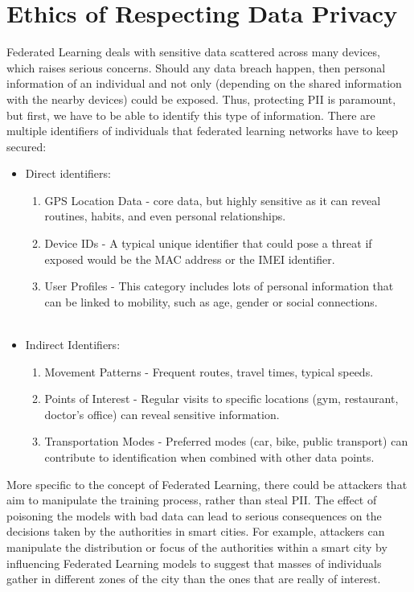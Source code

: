 \documentclass[conference]{IEEEtran}
\begin{document}
\section{Ethics of Respecting Data Privacy}
Federated Learning deals with sensitive data scattered across many devices, which raises serious concerns. Should any data breach happen, then personal information of an individual and not only (depending on the shared information with the nearby devices) could be exposed. Thus, protecting PII is paramount, but first, we have to be able to identify this type of information. There are multiple identifiers of individuals that federated learning networks have to keep secured:
\begin{itemize}
  \item Direct identifiers:
  \begin{enumerate}
    \item GPS Location Data - core data, but highly sensitive as it can reveal routines, habits, and even personal relationships.
    \item Device IDs - A typical unique identifier that could pose a threat if exposed would be the MAC address or the IMEI identifier.
    \item User Profiles - This category includes lots of personal information that can be linked to mobility, such as age, gender or social connections.\\\\
  \end{enumerate}
  \item Indirect Identifiers:
  \begin{enumerate}
    \item Movement Patterns - Frequent routes, travel times, typical speeds.
    \item Points of Interest - Regular visits to specific locations (gym, restaurant, doctor's office) can reveal sensitive information.
    \item Transportation Modes - Preferred modes (car, bike, public transport) can contribute to identification when combined with other data points.
  \end{enumerate}
\end{itemize}

More specific to the concept of Federated Learning, there could be attackers that aim to manipulate the training process, rather than steal PII. The effect of poisoning the models with bad data can lead to serious consequences on the decisions taken by the authorities in smart cities. For example, attackers can manipulate the distribution or focus of the authorities within a smart city by influencing Federated Learning models to suggest that masses of individuals gather in different zones of the city than the ones that are really of interest.
\end{document}
